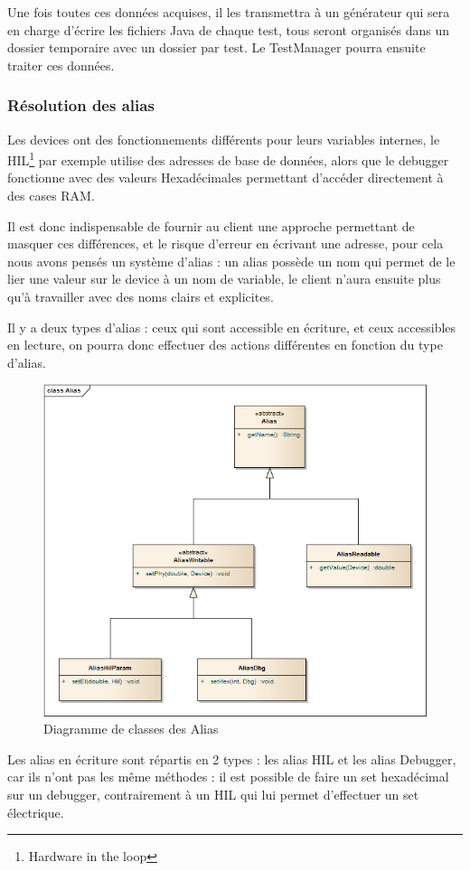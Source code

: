 	Une fois toutes ces données acquises, il les transmettra à un générateur qui sera en charge d'écrire les fichiers Java de chaque test, tous seront organisés dans un dossier temporaire avec un dossier par test. Le TestManager pourra ensuite traiter ces données.

	\subsubsection{Résolution des alias}\label{alias}
		Les devices ont des fonctionnements différents pour leurs variables internes, le HIL\footnote{Hardware in the loop} par exemple utilise des adresses de base de données, alors que le debugger fonctionne avec des valeurs Hexadécimales permettant d'accéder directement à des cases RAM.

		Il est donc indispensable de fournir au client une approche permettant de masquer ces différences, et le risque d'erreur en écrivant une adresse, pour cela nous avons pensés un système d'alias : un alias possède un nom qui permet de le lier une valeur sur le device à un nom de variable, le client n'aura ensuite plus qu'à travailler avec des noms clairs et explicites.

		Il y a deux types d'alias : ceux qui sont accessible en écriture, et ceux accessibles en lecture, on pourra donc effectuer des actions différentes en fonction du type d'alias.

		\begin{figure}[H]
			\centering
			\includegraphics[width=13cm]{contents/images/classAlias.png}
			\caption{Diagramme de classes des Alias}
		\end{figure}
		Les alias en écriture sont répartis en 2 types : les alias HIL et les alias Debugger, car ils n'ont pas les même méthodes : il est possible de faire un set hexadécimal sur un debugger, contrairement à un HIL qui lui permet d'effectuer un set électrique. 

